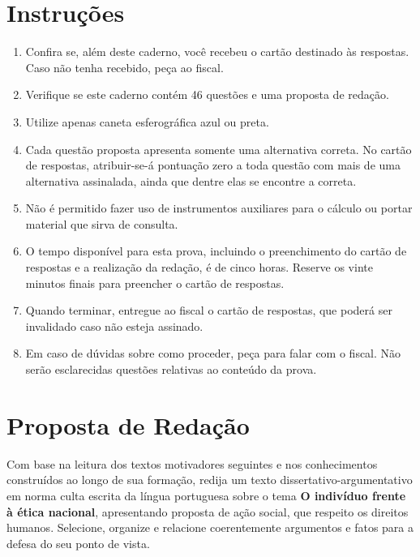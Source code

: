 \documentclass[10pt,a4paper]{article}
\begin{document}
\begin{center}
\end{center}

\section*{Instru\c{c}\~{o}es}
	\begin{enumerate}
	\item  Confira se, al\'em deste caderno, voc\^{e} recebeu o cart\~{a}o destinado \`as respostas. Caso n\~{a}o tenha recebido, pe\c{c}a ao fiscal.
	\item Verifique se este caderno cont\'em 46 quest\~{o}es e uma proposta de reda\c{c}\~{a}o.
	\item Utilize apenas caneta esferogr\'afica azul ou preta.
	\item Cada quest\~{a}o proposta apresenta somente uma alternativa correta. No cart\~{a}o de respostas, atribuir-se-\'a pontua\c{c}\~{a}o zero a toda quest\~{a}o com mais de uma alternativa assinalada, ainda que dentre elas se encontre a correta.
	\item N\~{a}o \'e permitido fazer uso de instrumentos auxiliares para o c\'alculo ou portar material que sirva de consulta.
	\item O tempo dispon\'ivel para esta prova, incluindo o preenchimento do cart\~{a}o de respostas e a realiza\c{c}\~{a}o da reda\c{c}\~{a}o, \'e de cinco horas. Reserve os vinte minutos finais para preencher o cart\~{a}o de respostas.
	\item Quando terminar, entregue ao fiscal o cart\~{a}o de respostas, que poder\'a ser invalidado caso n\~{a}o esteja assinado.
	\item Em caso de d\'uvidas sobre como proceder, pe\c{c}a para falar com o fiscal. N\~{a}o ser\~{a}o esclarecidas quest\~{o}es relativas ao conte\'udo da prova.
	\end{enumerate}

\section*{Proposta de Reda\c{c}\~ao}
	Com base na leitura dos textos motivadores seguintes e nos conhecimentos constru\'idos ao longo de sua forma\c{c}\~{a}o, redija um texto dissertativo-argumentativo em norma culta escrita da l\'ingua portuguesa sobre o tema \textbf{O indiv\'iduo frente \`a \'etica nacional}, apresentando proposta de a\c{c}\~{a}o social, que respeito os direitos humanos. Selecione, organize e relacione coerentemente argumentos e fatos para a defesa do seu ponto de vista. \\
\end{document}
